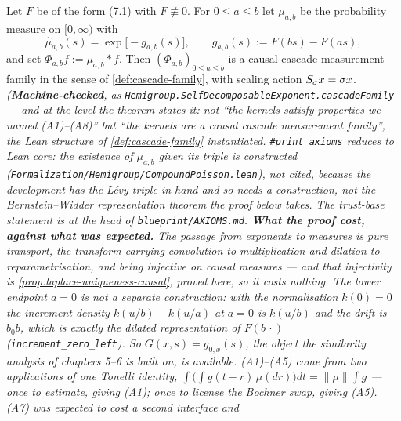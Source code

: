 \begin{theorem}\label{thm:main-construction}
\leanok
Let $F$ be of the form (7.1) with $F \not\equiv 0$. For $0 \le a \le b$ let $\mu_{a,b}$ be the
probability measure on $[0,\infty)$ with
\[
  \hat\mu_{a,b}(s) = \exp\bigl[-g_{a,b}(s)\bigr], \qquad g_{a,b}(s) := F(bs) - F(as),
\]
and set $\Phi_{a,b} f := \mu_{a,b} * f$. Then $(\Phi_{a,b})_{0 \le a \le b}$ is a causal cascade
measurement family in the sense of \ref{def:cascade-family}, with scaling action
$S_\sigma x = \sigma x$.
\statusT\quad\emph{(\textbf{Machine-checked}, as
\texttt{Hemigroup.SelfDecomposableExponent.cascadeFamily} --- and at the level the theorem
states it: not ``the kernels satisfy properties we named (A1)--(A8)'' but ``the kernels
\emph{are} a causal cascade measurement family'', the Lean structure of
\ref{def:cascade-family} instantiated. \texttt{\#print axioms} reduces to Lean core: the
existence of $\mu_{a,b}$ given its triple is constructed
(\texttt{Formalization/Hemigroup/CompoundPoisson.lean}), not cited, because the development has
the Lévy triple in hand and so needs a \emph{construction}, not the Bernstein--Widder
representation theorem the proof below takes. The trust-base statement is at the head of
\texttt{blueprint/AXIOMS.md}.
\textbf{What the proof cost, against what was expected.} The passage from exponents to measures
is pure transport, the transform carrying convolution to multiplication and dilation to
reparametrisation, and being injective on causal measures --- and that injectivity is
\ref{prop:laplace-uniqueness-causal}, proved here, so it costs nothing. The lower endpoint
$a = 0$ is not a separate construction: with the normalisation $k(0) = 0$ the increment density
$k(u/b) - k(u/a)$ at $a = 0$ is $k(u/b)$ and the drift is $b_0 b$, which is exactly the dilated
representation of $F(b\,\cdot)$ (\texttt{increment\_zero\_left}). So $G(x,s) = g_{0,x}(s)$, the
object the similarity analysis of chapters 5--6 is built on, is available.
(A1)--(A5) come from two applications of one Tonelli identity,
$\int \bigl(\int g(t-r)\,\mu(dr)\bigr)dt = \|\mu\| \int g$ --- once to estimate, giving (A1);
once to license the Bochner swap, giving (A5). (A7) was expected to cost a second interface and
}
\end{theorem}
